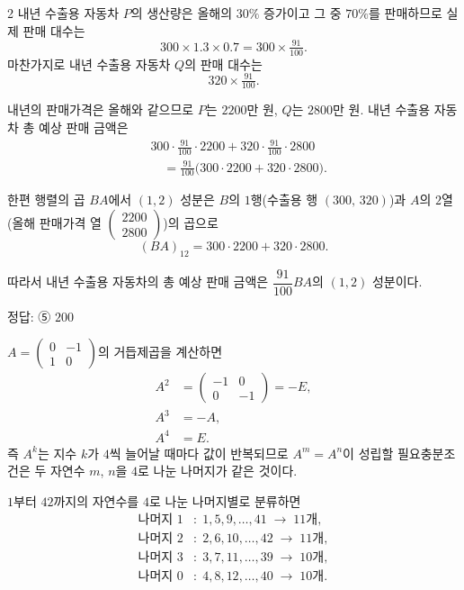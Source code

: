 \documentclass[10pt]{article}
\begin{document}
\begin{multicols}{2}
내년 수출용 자동차 $P$의 생산량은 올해의 $30\%$ 증가이고 그 중 $70\%$를 판매하므로 실제 판매 대수는
\[ 300 \times 1.3 \times 0.7 = 300 \times \tfrac{91}{100}. \]
마찬가지로 내년 수출용 자동차 $Q$의 판매 대수는
\[ 320 \times \tfrac{91}{100}. \]

내년의 판매가격은 올해와 같으므로 $P$는 $2200$만 원, $Q$는 $2800$만 원. 내년 수출용 자동차 총 예상 판매 금액은
\begin{align*}
&300 \cdot \tfrac{91}{100} \cdot 2200 + 320 \cdot \tfrac{91}{100} \cdot 2800 \\
&\quad = \tfrac{91}{100}\bigl(300 \cdot 2200 + 320 \cdot 2800\bigr).
\end{align*}

한편 행렬의 곱 $BA$에서 $(1, 2)$ 성분은 $B$의 $1$행(수출용 행 $(300,\,320)$)과 $A$의 $2$열(올해 판매가격 열 $\begin{pmatrix} 2200 \\ 2800 \end{pmatrix}$)의 곱으로
\[ (BA)_{12} = 300 \cdot 2200 + 320 \cdot 2800. \]

따라서 내년 수출용 자동차의 총 예상 판매 금액은 $\dfrac{91}{100} BA$의 $(1, 2)$ 성분이다.

\begin{answerbox}정답: ⑤ $200$\end{answerbox}

$A = \begin{pmatrix} 0 & -1 \\ 1 & 0 \end{pmatrix}$의 거듭제곱을 계산하면
\begin{align*}
A^2 &= \begin{pmatrix} -1 & 0 \\ 0 & -1 \end{pmatrix} = -E, \\
A^3 &= -A, \\
A^4 &= E.
\end{align*}
즉 $A^k$는 지수 $k$가 $4$씩 늘어날 때마다 값이 반복되므로 $A^m = A^n$이 성립할 필요충분조건은 두 자연수 $m$, $n$을 $4$로 나눈 나머지가 같은 것이다.

$1$부터 $42$까지의 자연수를 $4$로 나눈 나머지별로 분류하면
\begin{align*}
\text{나머지 } 1&:\; 1, 5, 9, \ldots, 41 \;\to\; 11\text{개}, \\
\text{나머지 } 2&:\; 2, 6, 10, \ldots, 42 \;\to\; 11\text{개}, \\
\text{나머지 } 3&:\; 3, 7, 11, \ldots, 39 \;\to\; 10\text{개}, \\
\text{나머지 } 0&:\; 4, 8, 12, \ldots, 40 \;\to\; 10\text{개}.
\end{align*}


\end{multicols}
\end{document}

